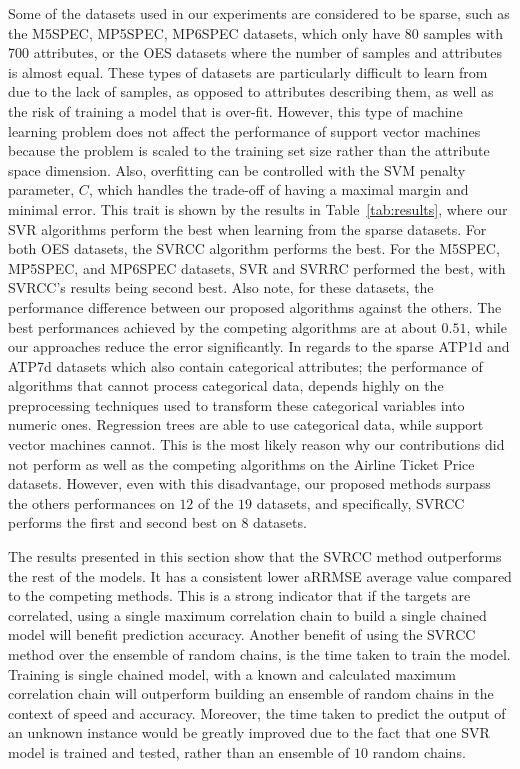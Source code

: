 \documentclass[preprint,12pt]{elsarticle}
\begin{document}
Some of the datasets used in our experiments are considered to be sparse, such as the M5SPEC, MP5SPEC, MP6SPEC datasets, which only have 80 samples with 700 attributes, or the OES datasets where the number of samples and attributes is almost equal. These types of datasets are particularly difficult to learn from due to the lack of samples, as opposed to attributes describing them, as well as the risk of training a model that is over-fit. However, this type of machine learning problem does not affect the performance of support vector machines because the problem is scaled to the training set size rather than the attribute space dimension. Also, overfitting can be controlled with the SVM penalty parameter, $C$, which handles the trade-off of having a maximal margin and minimal error. This trait is shown by the results in Table~\ref{tab:results}, where our SVR algorithms perform the best when learning from the sparse datasets. For both OES datasets, the SVRCC algorithm performs the best. For the M5SPEC, MP5SPEC, and MP6SPEC datasets, SVR and SVRRC performed the best, with SVRCC's results being second best. Also note, for these datasets, the performance difference between our proposed algorithms against the others. The best performances achieved by the competing algorithms are at about $0.51$, while our approaches reduce the error significantly. In regards to the sparse ATP1d and ATP7d datasets which also contain categorical attributes; the performance of algorithms that cannot process categorical data, depends highly on the preprocessing techniques used to transform these categorical variables into numeric ones. Regression trees are able to use categorical data, while support vector machines cannot. This is the most likely reason why our contributions did not perform as well as the competing algorithms on the Airline Ticket Price datasets. However, even with this disadvantage, our proposed methods surpass the others performances on $12$ of the $19$ datasets, and specifically, SVRCC performs the first and second best on $8$ datasets.

The results presented in this section show that the SVRCC method outperforms the rest of the models. It has a consistent lower aRRMSE average value compared to the competing methods. This is a strong indicator that if the targets are correlated, using a single maximum correlation chain to build a single chained model will benefit prediction accuracy. Another benefit of using the SVRCC method over the ensemble of random chains, is the time taken to train the model. Training is single chained model, with a known and calculated maximum correlation chain will outperform building an ensemble of random chains in the context of speed and accuracy. Moreover, the time taken to predict the output of an unknown instance would be greatly improved due to the fact that one SVR model is trained and tested, rather than an ensemble of $10$ random chains. 
\end{document}
